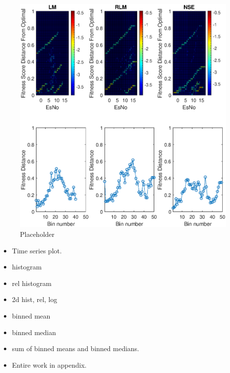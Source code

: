 \begin{figure}[ht]
\centering
\includegraphics[width=\textwidth]{figures/flight_results/Coop_good_overview.eps}
\caption{Placeholder}
\end{figure}


\begin{itemize}
	\item Time series plot.
	\item histogram
	\item rel histogram
	\item 2d hist, rel, log
	\item binned mean
	\item binned median
	\item sum of binned means and binned medians.
	\item Entire work in appendix.
\end{itemize}